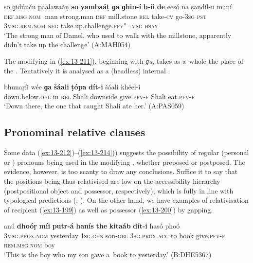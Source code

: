 \begin{exe}
\ex
\label{ex:13-210}
\gll so ɡiḍúuču paalawaáṇ \textbf{so} \textbf{yambaáṭ} \textbf{ɡa} \textbf{ɡhin-í} \textbf{b-íi} \textbf{de} eesó na ṣandíl-u maní\\
\textsc{def.msg.nom} \iliDameli.man strong.man \textsc{def} mill.stone \textsc{rel} take-\textsc{cv} go-\textsc{3sg} \textsc{pst} \textsc{3msg.rem.nom} \textsc{neg} take.up.challenge.\textsc{pfv"=msg} \textsc{hsay}\\
\glt `The strong man of Damel, who used to walk with the millstone, apparently didn't take up the challenge' (A:MAH054)
\end{exe}

The modifying  in (\ref{ex:13-211}), beginning with \textit{ɡa}, takes as a~whole the place of the  . Tentatively it is analysed as a (headless) internal .

\begin{exe}
\ex
\label{ex:13-211}
\gll bhunaṛíi wée \textbf{ɡa} \textbf{šáali} \textbf{ṭópa} \textbf{dít-i}  šáali khéel-i \\
down.below.\textsc{obl} in \textsc{rel} Shali downside give.\textsc{pfv-f} Shali eat.\textsc{pfv-f} \\
\glt `Down there, the one that caught Shali ate her.' (A:PAS059)
\end{exe}

\subsection{Pronominal relative clauses}
\label{subsec:13-6-5}


Some data (\ref{ex:13-212})--(\ref{ex:13-214})) suggests the possibility of regular  (personal or ) pronouns being used in the modifying , whether preposed or postposed. The evidence, however, is too scanty to draw any  conclusions. Suffice it to say that the positions being thus relativised are low on the accessibility hierarchy (postpositional object and possessor, respectively), which is fully in line with typological predictions (\citealt[147--148]{keenan1985}; \citealt[226]{andrews_relative2007}). On the other hand, we have examples of relativisation of recipient (\ref{ex:13-199}) as well as possessor (\ref{ex:13-200}) by gapping.

\ea
\label{ex:13-212}
\gll anú \textbf{dhoóṛ} \textbf{míi} \textbf{putr-á} \textbf{hanís} \textbf{the} \textbf{kitaáb} \textbf{dít-i} hasó phoó\\
\textsc{3msg.prox.nom} yesterday \textsc{1sg.gen} son-\textsc{obl} \textsc{3sg.prox.acc} to  book give.\textsc{pfv-f} \textsc{rem.msg.nom} boy \\
\glt `This is the boy who my son gave a~book to yesterday.' (B:DHE5367)

